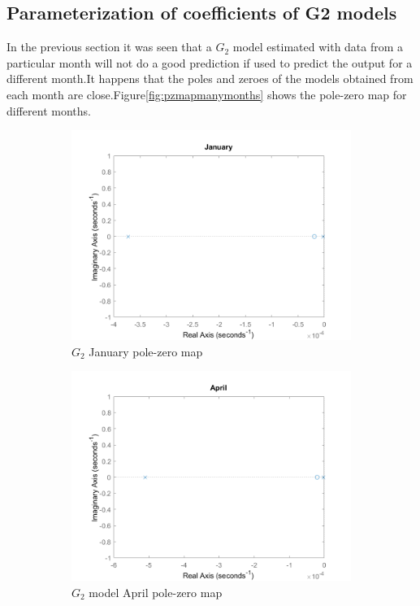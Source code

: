 \documentclass[a4paper,12pt]{article}
\numberwithin{equation}{section}
\begin{document}
\subsection{Parameterization of coefficients of G2 models}
In the previous section it was seen that a $G_{2}$ model estimated with data from a particular month will not do a good prediction if used to predict the output for a different month.It happens that the poles and zeroes of the models obtained from each month are close.Figure\ref{fig:pzmapmanymonths} shows the pole-zero map for different months.

\begin{figure}[H]
\centering
\begin{subfigure}{.5\textwidth}
  \centering
  \includegraphics[width=.7\linewidth]{G2_jan_pzmap.png}
  \caption{$G_{2}$ January pole-zero map}
  \label{fig:G2_jan_pzmap}
\end{subfigure}%
\begin{subfigure}{.5\textwidth}
  \centering
  \includegraphics[width=.7\linewidth]{G2_apr_pzmap.png}
  \caption{$G_{2}$ model April pole-zero map}
  \label{fig:G2_apr_pzmap}
\end{subfigure}
\begin{subfigure}{.5\textwidth}

\end{subfigure}
\end{figure}
\end{document}
